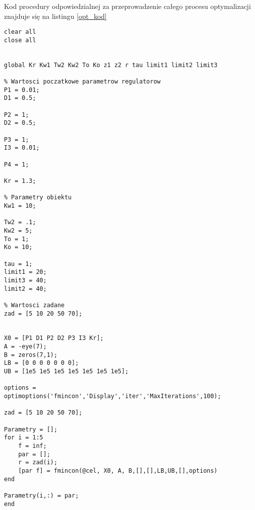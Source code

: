 Kod procedury odpowiedzialnej za przeprowadzenie całego procesu optymalizacji znajduje się na listingu \ref{opt_kod}
 \lstset { %
	language=Matlab
}
\begin{lstlisting}[frame=single, caption=Procedura optymalizacji, label=opt_kod]
clear all
close all


global Kr Kw1 Tw2 Kw2 To Ko z1 z2 r tau limit1 limit2 limit3

% Wartosci poczatkowe parametrow regulatorow
P1 = 0.01;
D1 = 0.5;

P2 = 1;
D2 = 0.5;

P3 = 1;
I3 = 0.01;

P4 = 1;

Kr = 1.3;

% Parametry obiektu
Kw1 = 10;

Tw2 = .1;
Kw2 = 5;
To = 1;
Ko = 10;

tau = 1;
limit1 = 20;
limit3 = 40;
limit2 = 40;

% Wartosci zadane
zad = [5 10 20 50 70]; 


X0 = [P1 D1 P2 D2 P3 I3 Kr];
A = -eye(7);
B = zeros(7,1);
LB = [0 0 0 0 0 0 0];
UB = [1e5 1e5 1e5 1e5 1e5 1e5 1e5];

options = optimoptions('fmincon','Display','iter','MaxIterations',100);

zad = [5 10 20 50 70];

Parametry = [];
for i = 1:5
	f = inf;
	par = [];
	r = zad(i);
	[par f] = fmincon(@cel, X0, A, B,[],[],LB,UB,[],options)
end

Parametry(i,:) = par;
end
\end{lstlisting}
